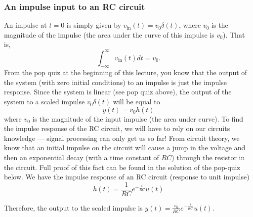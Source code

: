 \documentclass{ee102_notes}
\begin{document}
\subsubsection{An impulse input to an RC circuit}
An impulse at $t = 0$ is simply given by $v_{\text{in}}(t) = v_0\delta(t)$, where $v_0$ is the magnitude of the impulse (the area under the curve of this impulse is $v_0$). That is, 
\[
\int_{-\infty}^{\infty} v_{\text{in}}(t) dt = v_0.
\]
From the pop quiz at the beginning of this lecture, you know that the output of the system (with zero initial conditions) to an impulse is just the impulse response. Since the system is linear (see pop quiz above), the output of the system to a scaled impulse $v_0\delta(t)$ will be equal to   
\[
y(t) = v_0 h(t)
\] 
where $v_0$ is the magnitude of the input impulse (the area under curve). To find the impulse response of the RC circuit, we will have to rely on our circuits knowledge --- signal processing can only get us so far! From circuit theory, we know that an initial impulse on the circuit will cause a jump in the voltage and then an exponential decay (with a time constant of $RC$) through the resistor in the circuit. Full proof of this fact can be found in the solution of the pop-quiz below. We have the impulse response of an RC circuit (response to unit impulse)
\begin{equation}
\label{eq:h-rc}
h(t) = \frac{1}{RC}e^{-\frac{t}{RC}}u(t)
\end{equation}

Therefore, the output to the scaled impulse is $y(t) = \frac{v_0}{RC} e^{-\frac{t}{RC}}u(t)$.
\end{document}
